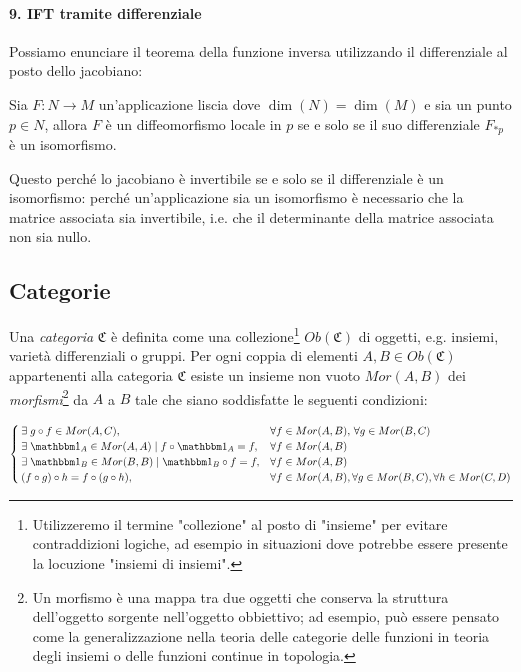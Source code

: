 \paragraph{9. IFT tramite differenziale}

Possiamo enunciare il teorema della funzione inversa utilizzando il differenziale al posto dello jacobiano:

\begin{theorem}
	Sia $ F : N \to M $ un'applicazione liscia dove $ \dim(N) = \dim(M) $ e sia un punto $ p \in N $, allora $ F $ è un diffeomorfismo locale in $ p $ se e solo se il suo differenziale $ F_{*p} $ è un isomorfismo.
\end{theorem}

Questo perché lo jacobiano è invertibile se e solo se il differenziale è un isomorfismo: perché un'applicazione sia un isomorfismo è necessario che la matrice associata sia invertibile, i.e. che il determinante della matrice associata non sia nullo.

\subsection{Categorie}

Una \textit{categoria} $ \mathfrak{C} $ è definita come una collezione\footnote{%
	Utilizzeremo il termine "collezione" al posto di "insieme" per evitare contraddizioni logiche, ad esempio in situazioni dove potrebbe essere presente la locuzione "insiemi di insiemi".%
} $ Ob(\mathfrak{C}) $ di oggetti, e.g. insiemi, varietà differenziali o gruppi. Per ogni coppia di elementi $ A,B \in Ob(\mathfrak{C}) $ appartenenti alla categoria $ \mathfrak{C} $ esiste un insieme non vuoto $ Mor(A,B) $ dei \textit{morfismi}\footnote{%
	Un morfismo è una mappa tra due oggetti che conserva la struttura dell'oggetto sorgente nell'oggetto obbiettivo; ad esempio, può essere pensato come la generalizzazione nella teoria delle categorie delle funzioni in teoria degli insiemi o delle funzioni continue in topologia.%
} da $ A $ a $ B $ tale che siano soddisfatte le seguenti condizioni:

\begin{equation}
	\begin{cases}
		\E g \circ f \in Mor(A,C), & \forall f \in Mor(A,B), \, \forall g \in Mor(B,C)\\
		\E \bigone_{A} \in Mor(A,A) \mid f \circ \bigone_{A} = f, & \forall f \in Mor(A,B)\\
		\E \bigone_{B} \in Mor(B,B) \mid \bigone_{B} \circ f = f, & \forall f \in Mor(A,B)\\
		(f \circ g) \circ h = f \circ (g \circ h), & \forall f \in Mor(A,B), \forall g \in Mor(B,C), \forall h \in Mor(C,D)
	\end{cases}
\end{equation}

